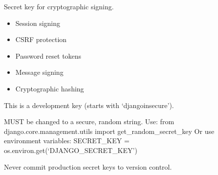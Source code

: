 \documentclass[letterpaper,10pt,english]{sphinxmanual}
\begin{document}

\begin{fulllineitems}
\label{\detokenize{softwareProject:softwareProject.settings.SECRET_KEY}}
\pysigstartsignatures
\pysigline
{}
\pysigstopsignatures
\sphinxAtStartPar
Secret key for cryptographic signing.
\begin{description}
\begin{itemize}
\item {} 
\sphinxAtStartPar
Session signing

\item {} 
\sphinxAtStartPar
CSRF protection

\item {} 
\sphinxAtStartPar
Password reset tokens

\item {} 
\sphinxAtStartPar
Message signing

\item {} 
\sphinxAtStartPar
Cryptographic hashing

\end{itemize}

\sphinxAtStartPar
This is a development key (starts with ‘django\sphinxhyphen{}insecure’).

\sphinxAtStartPar
MUST be changed to a secure, random string.
Use: from django.core.management.utils import get\_random\_secret\_key
Or use environment variables: SECRET\_KEY = os.environ.get(‘DJANGO\_SECRET\_KEY’)

\end{description}

\sphinxAtStartPar
Never commit production secret keys to version control.

\end{fulllineitems}

\end{document}
